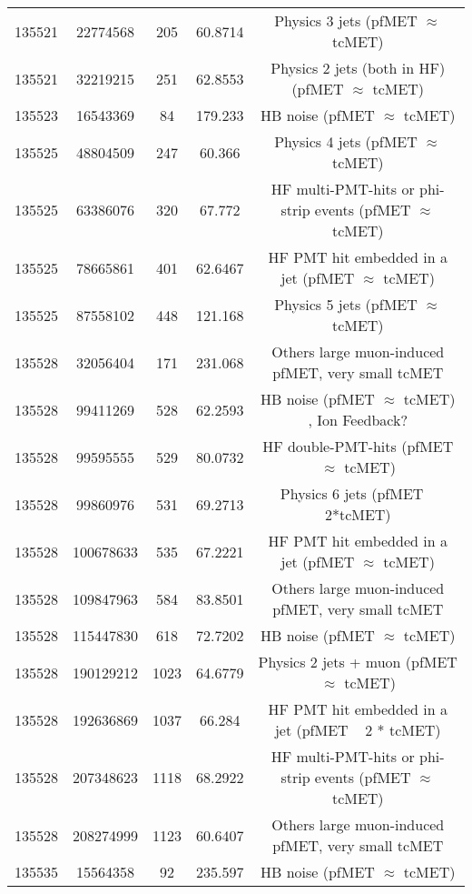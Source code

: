 \begin{table}[htbp]
\begin{center}
\begin{tabular}{|c|c|c|c|c|}
      135521 & 22774568    &  205  &    60.8714  & Physics 3 jets (pfMET $\approx$ tcMET) \\
      135521 & 32219215    &  251  &    62.8553  & Physics 2 jets (both in HF) (pfMET $\approx$ tcMET) \\ 
      135523 & 16543369    &  84   &    179.233  & HB noise (pfMET $\approx$ tcMET) \\
      135525 & 48804509    &  247  &    60.366   & Physics 4 jets (pfMET $\approx$ tcMET) \\
      135525 & 63386076    &  320  &    67.772   & HF multi-PMT-hits or phi-strip events (pfMET $\approx$ tcMET) \\
      135525 & 78665861    &  401  &    62.6467  & HF PMT hit embedded in a jet (pfMET $\approx$ tcMET) \\
      135525 & 87558102    &  448  &    121.168  & Physics 5 jets (pfMET $\approx$ tcMET) \\
      135528 & 32056404    &  171  &    231.068  & Others large muon-induced pfMET, very small tcMET \\
      135528 & 99411269    &  528  &    62.2593  & HB noise (pfMET $\approx$ tcMET) , Ion Feedback? \\
      135528 & 99595555    &  529  &    80.0732  & HF double-PMT-hits (pfMET $\approx$ tcMET) \\
      135528 & 99860976    &  531  &    69.2713  & Physics 6 jets (pfMET ~ 2*tcMET) \\
      135528 & 100678633   &  535  &    67.2221  & HF PMT hit embedded in a jet (pfMET $\approx$ tcMET) \\
      135528 & 109847963   &  584  &    83.8501  & Others large muon-induced pfMET, very small tcMET \\
      135528 & 115447830   &  618  &    72.7202  & HB noise (pfMET $\approx$ tcMET) \\
      135528 & 190129212   &  1023 &    64.6779  & Physics 2 jets + muon (pfMET $\approx$ tcMET) \\
      135528 & 192636869   &  1037 &    66.284   & HF PMT hit embedded in a jet (pfMET ~ 2 * tcMET) \\
      135528 & 207348623   &  1118 &    68.2922  & HF multi-PMT-hits or phi-strip events (pfMET $\approx$ tcMET) \\
      135528 & 208274999   &  1123 &    60.6407  & Others large muon-induced pfMET, very small tcMET \\
      135535 & 15564358    &  92   &    235.597  & HB noise (pfMET $\approx$ tcMET) \\

\end{tabular}
\end{center}
\end{table}
